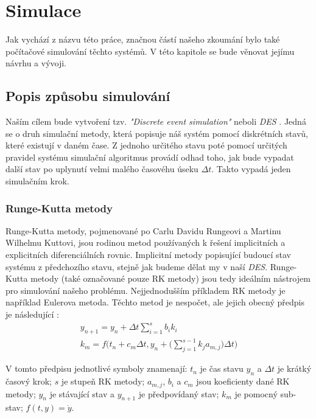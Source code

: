 \chapter{Simulace}
\label{chap:sim}

Jak vychází z názvu této práce, značnou částí našeho zkoumání bylo také počítačové simulování těchto systémů. V této kapitole se bude věnovat jejímu návrhu a vývoji.

\section{Popis způsobu simulování}

Naším cílem bude vytvoření tzv. \textit{"Discrete event simulation"} neboli \textit{DES} \cite{sim_methods}. Jedná se o druh simulační metody, která popisuje náš systém pomocí diskrétních stavů, které existují v daném čase. Z jednoho určitého stavu poté pomocí určitých pravidel systému simulační algoritmus provádí odhad toho, jak bude vypadat další stav po uplynutí velmi malého časovéhu úseku $\Delta t$. Takto vypadá jeden simulačním krok.

\subsection{Runge-Kutta metody}

Runge-Kutta metody, pojmenované po Carlu Davidu Rungeovi a Martinu Wilhelmu Kuttovi, jsou rodinou metod používaných k řešení implicitních a explicitních diferenciálních rovnic. Implicitní metody popisující budoucí stav systému z předchozího stavu, stejně jak budeme dělat my v naší \textit{DES}. Runge-Kutta metody (také označované pouze RK metody) jsou tedy ideálním nástrojem pro simulování našeho problému. Nejjednodušším příkladem RK metody je například Eulerova metoda. Těchto metod je nespočet, ale jejich obecný předpis je následující \cite{RK_def}:
\begin{equation}
    \label{eq:RK_def}
    \begin{gathered}
        y_{n+1} = y_n + \Delta t \sum_{i=1}^{s} b_i k_i \\
        k_m = f \Bigg(t_n + c_m \Delta t, y_n + \Bigg(\sum_{j=1}^{s-1} k_j a_{m,j} \Bigg) \Delta t \Bigg)
    \end{gathered}
\end{equation}

V tomto předpisu jednotlivé symboly znamenají: $t_n$ je čas stavu $y_n$ a $\Delta t$ je krátký časový krok; $s$ je stupeň RK metody; $a_{m,j}$, $b_i$ a $c_m$ jsou koeficienty dané RK metody; $y_n$ je stávající stav a $y_{n+1}$ je předpovídaný stav; $k_m$ je pomocný sub-stav; $f(t,y) = \dot{y}$.

